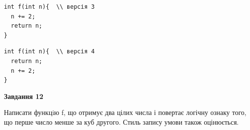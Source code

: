 \documentclass[12pt, ukrainian]{article}
\begin{document}
{\begin {large}
\begin{minipage}[t]{11.0cm}
\vspace{-8mm}\begin{verbatim}
int f(int n){  \\ версія 3
  n += 2;
  return n;
}
\end{verbatim}

\vspace{-8mm}\begin{verbatim}
int f(int n){  \\ версія 4
  return n;
  n += 2;
}
\end{verbatim}



\begin{center}
\textbf{Завдання 12}
\end{center}

Написати функцiю f, що отримує два цілих числа і повертає логічну ознаку того, що перше число менше за куб другого. Стиль запису умови також оцінюється.\par

\end{minipage}

\end {large}}
\newpage
\end{document}
